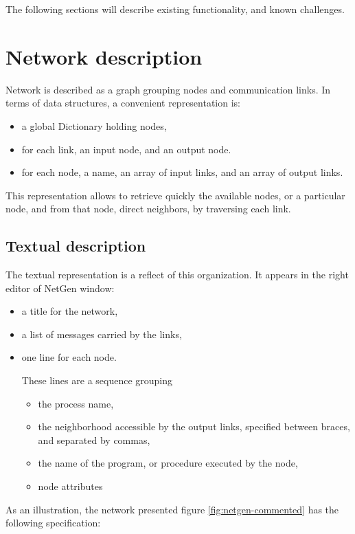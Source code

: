 \documentclass[times]{book}
\begin{document}
The following sections will describe existing functionality, and known challenges.


\section{Network description}

Network is described as a graph grouping nodes and communication links. In terms of data structures,
a convenient  representation is:

\begin{itemize}
\item a global Dictionary holding nodes,
\item for each link, an input node, and an output node.
\item for each node, a name, an array of input links, and an array of output links.
\end{itemize}

This representation allows to retrieve quickly the available nodes, or a particular node,
and from that node, direct neighbors, by traversing each link.

\subsection{Textual description}

The textual representation is a reflect of this organization. It appears in the right editor of NetGen window:


\begin{itemize}
\item  a title for the network, 
\item a list of messages carried by the links, 
\item  one line for each node.

These lines are a sequence grouping
\begin{itemize}
\item  the process name,
\item the neighborhood accessible by the output links, specified between braces, and separated by commas,
\item the name of the program, or procedure executed by the node,
\item node attributes
\end{itemize}

\end{itemize}

As an illustration, the network presented  figure \ref{fig:netgen-commented}  has the following specification:
  
\end{document}
